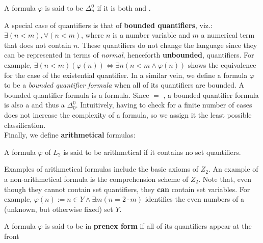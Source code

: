 \documentclass[../main.tex]{memoir}
\begin{document}
\begin{definition}
  A formula $\varphi$ is said to be $\Delta_{n}^{0}$ if it is both  and .
\end{definition}

A special case of quantifiers is that of \textbf{bounded quantifiers}, viz.: $\exists (n < m), \forall (n < m)$, where $n$ is a number variable and $m$ a numerical term that does not contain $n$. These quantifiers do not change the language since they can be represented in terms of \textit{normal}, henceforth \textbf{unbounded}, quantifiers. For example, $\exists (n < m) (\varphi(n)) \iff \exists n (n < m \land \varphi(n))$ shows the equivalence for the case of the existential quantifier. In a similar vein, we define a formula $\varphi$ to be a \textit{bounded quantifier formula} when all of its quantifiers are bounded. A bounded quantifier formula is a  formula. Since  $ = $ , a bounded quantifier formula is also a  and thus a $\Delta_{0}^{0}$. Intuitively, having to check for a finite number of cases does not increase the complexity of a formula, so we assign it the least possible classification. \\

Finally, we define \textbf{arithmetical} formulas:

\begin{definition}
  A formula $\varphi$ of $L_2$ is said to be arithmetical if it contains no set quantifiers.
\end{definition}

Examples of arithmetical formulas include the basic axioms of $Z_2$. An example of a non-arithmetical formula is the comprehension scheme of $Z_2$. Note that, even though they cannot contain set quantifiers, they \textbf{can} contain set variables. For example, $\varphi(n) := n \in Y \land \exists m (n = 2 \cdot m)$ identifies the even numbers of a (unknown, but otherwise fixed) set $Y$. \\

\begin{definition}
  A formula $\varphi$ is said to be in \textbf{prenex form} if all of its quantifiers appear at the front
\end{definition}
\end{document}
